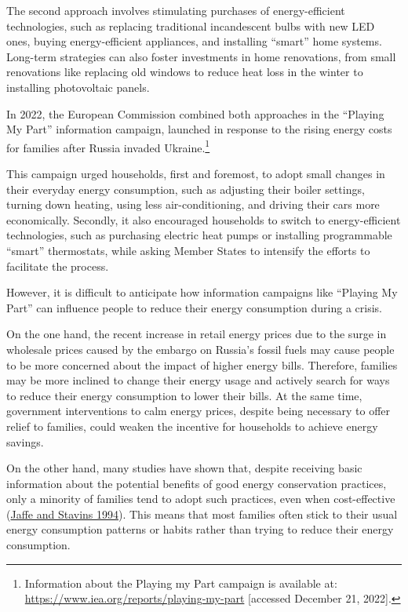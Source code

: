 \documentclass[
  11pt,
  captions=heading]{scrreport}
\begin{document}
The second approach involves stimulating purchases of energy-efficient
technologies, such as replacing traditional incandescent bulbs with new
LED ones, buying energy-efficient appliances, and installing ``smart''
home systems. Long-term strategies can also foster investments in home
renovations, from small renovations like replacing old windows to reduce
heat loss in the winter to installing photovoltaic panels.

In 2022, the European Commission combined both approaches in the
``Playing My Part'' information campaign, launched in response to the
rising energy costs for families after Russia invaded
Ukraine.\footnote{Information about the Playing my Part campaign is
  available at: \url{https://www.iea.org/reports/playing-my-part}
  {[}accessed December 21, 2022{]}.}

This campaign urged households, first and foremost, to adopt small
changes in their everyday energy consumption, such as adjusting their
boiler settings, turning down heating, using less air-conditioning, and
driving their cars more economically. Secondly, it also encouraged
households to switch to energy-efficient technologies, such as
purchasing electric heat pumps or installing programmable ``smart''
thermostats, while asking Member States to intensify the efforts to
facilitate the process.

However, it is difficult to anticipate how information campaigns like
``Playing My Part'' can influence people to reduce their energy
consumption during a crisis.

On the one hand, the recent increase in retail energy prices due to the
surge in wholesale prices caused by the embargo on Russia's fossil fuels
may cause people to be more concerned about the impact of higher energy
bills. Therefore, families may be more inclined to change their energy
usage and actively search for ways to reduce their energy consumption to
lower their bills. At the same time, government interventions to calm
energy prices, despite being necessary to offer relief to families,
could weaken the incentive for households to achieve energy savings.

On the other hand, many studies have shown that, despite receiving basic
information about the potential benefits of good energy conservation
practices, only a minority of families tend to adopt such practices,
even when cost-effective (\protect\hyperlink{ref-jaffe1994energy}{Jaffe
and Stavins 1994}). This means that most families often stick to their
usual energy consumption patterns or habits rather than trying to reduce
their energy consumption.
\end{document}
